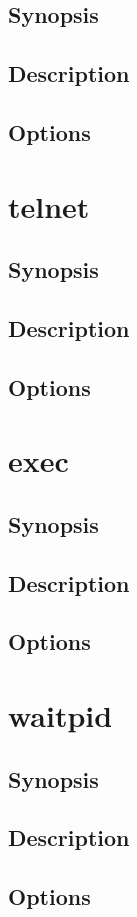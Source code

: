 \documentclass[a4paper, 10pt, onecolumn, openright, oneside]{book}
\begin{document}
			\subsection{Synopsis}
			\subsection{Description}
			\subsection{Options}
		\section{telnet}
			\subsection{Synopsis}
			\subsection{Description}
			\subsection{Options}
		\section{exec}
			\subsection{Synopsis}
			\subsection{Description}
			\subsection{Options}
		\section{waitpid}
			\subsection{Synopsis}
			\subsection{Description}
			\subsection{Options}
\end{document}
